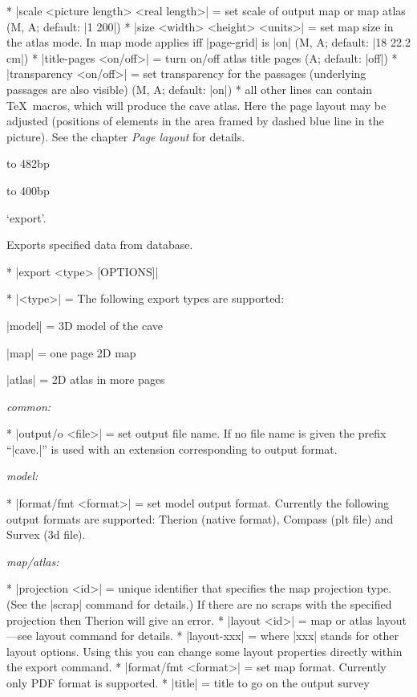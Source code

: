   * |scale <picture length> <real length>| = set scale of
    output map or map atlas (M, A; default: |1 200|)
  * |size <width> <height> <units>| = set map size in the atlas mode.
    In map mode applies iff |page-grid| is |on| (M, A; default: |18 22.2 cm|)
  * |title-pages <on/off>| = turn on/off atlas title pages (A; default: |off|)
  * |transparency <on/off>| = set transparency for the passages (underlying 
    passages are also visible) (M, A; default: |on|)
  * all other lines can contain \TeX\ macros, which will produce
    the cave atlas. Here the page layout may be adjusted (positions
    of elements in the area framed by dashed blue line in the picture).
    See the chapter {\it Page layout} for details.
\endcomopt

\midinsert
  \ifx\pdfoutput\undefined\else
  \fi
  \vbox to 482bp{\centerline{\hbox to 400bp{%
    \ifx\pdfoutput\undefined
    \else
      \rlap{\pdfrefximage\pdflastximage}%
    \fi
    \hss}}\vss
  }
\endinsert


\subsubchapter `export'.

\description
  Exports specified data from database. 
\enddescription

\syntax
  \list
    * |export <type> [OPTIONS]| 
  \endlist
\endsyntax

\arguments
  * |<type>| = The following export types are supported:

    |model| = 3D model of the cave

    |map| = one page 2D map

    |atlas| = 2D atlas in more pages
\endarguments

\options
  {\it common:}

  * |output/o <file>| = set output file name. If no file name is
    given the prefix ``|cave.|'' is used with an extension corresponding to
    output format.

  {\it model:}

  * |format/fmt <format>| = set model output format. Currently the following
    output formats are supported: Therion (native format), Compass 
    (plt file) and Survex (3d file).

  {\it map/atlas:}
  
  * |projection <id>| = unique identifier that specifies the map projection type.
    (See the |scrap| command for details.) If there are no scraps with 
    the specified projection then Therion will give an error. 
  * |layout <id>| = map or atlas layout---see layout command for details.
  * |layout-xxx| = where |xxx| stands for other layout options. Using this
    you can change some layout properties directly within the export command.
  * |format/fmt <format>| = set map format. Currently only PDF format
    is supported.
  * |title| = title to go on the output survey    
\endoptions



